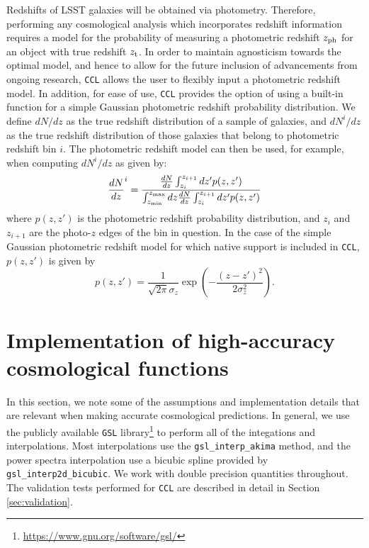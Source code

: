 \documentclass[\docopts]{\docclass}
\newcommand{\ccl}{{\tt CCL}\xspace}
\begin{document}
Redshifts of LSST galaxies will be obtained via photometry. Therefore, performing any cosmological analysis which incorporates redshift information requires a model for the probability of measuring a photometric redshift $z_{\rm ph}$ for an object with true redshift $z_{\rm t}$.  In order to maintain agnosticism towards the optimal model, and hence to allow for the future inclusion of advancements from ongoing research, \ccl allows the user to flexibly input a photometric redshift model. In addition, for ease of use, \ccl provides the option of using a built-in function for a simple Gaussian photometric redshift probability distribution. We define $dN/dz$ as the true redshift distribution of a sample of galaxies, and $dN^i/dz$ as the true redshift distribution of those galaxies that belong to photometric redshift bin $i$. The photometric redshift model can then be used, for example, when computing $dN^i/dz$ as given by:
\begin{equation}
\frac{dN}{dz}^i = \frac{\frac{dN}{dz}\int_{z_i}^{z_{i+1}} dz' p(z,z')}{\int_{z_{\rm min}}^{z_{\rm max}}dz \frac{dN}{dz} \int_{z_i}^{z_{i+1}}dz' p(z, z')}
\label{photoz}
\end{equation}
where $p(z,z')$ is the photometric redshift probability distribution, and $z_{i}$ and $z_{i+1}$ are the photo-$z$ edges of the bin in question. In the case of the simple Gaussian photometric redshift model for which native support is included in \ccl , $p(z, z')$ is given by
\begin{equation}
p(z,z') = \frac{1}{\sqrt{2 \pi}\sigma_z} \exp\left(-\frac{(z-z')^2}{2\sigma_z^2}\right).
\label{pz_gauss}
\end{equation}

\section{Implementation of high-accuracy cosmological functions}
\label{sec:implement}

In this section, we note some of the assumptions and implementation details that are relevant when making accurate cosmological predictions. In general, we use the publicly available {\tt GSL} library\footnote{\url{https://www.gnu.org/software/gsl/}} to perform all of the integations and interpolations. Most interpolations use the {\tt gsl\_interp\_akima} method, and the power spectra interpolation use a bicubic spline provided by {\tt gsl\_interp2d\_bicubic}. We work with double precision quantities throughout. The validation tests performed for {\tt CCL} are described in detail in Section \ref{sec:validation}.
\end{document}
